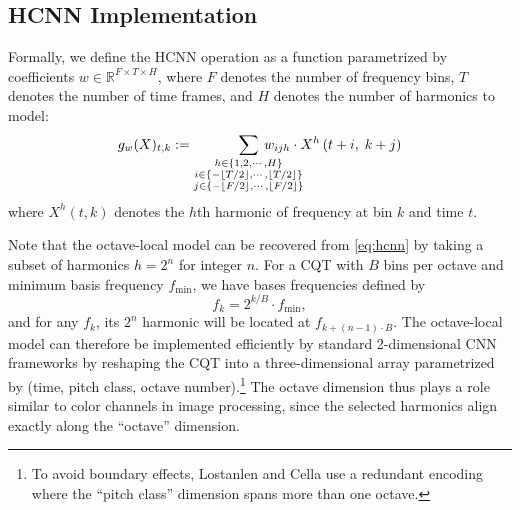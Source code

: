 \documentclass{article}
\begin{document}
\subsection{HCNN Implementation}

Formally, we define the HCNN operation as a function parametrized by coefficients $w \in \mathbb{R}^{F \times T \times H}$, where $F$ denotes the number of frequency bins, $T$ denotes the number of time frames, and $H$ denotes the number of harmonics to model:
\begin{equation}
    g_w(X)_{t, k} := 
    \sum_{\substack{
        h \in \{1, 2, \cdots, H\}\\
        i \in \{-\lfloor T/2\rfloor, \cdots, \lfloor T/2 \rfloor\}\\
        j \in \{-\lfloor F/2\rfloor, \cdots, \lfloor F/2 \rfloor\}}
    }
    \hspace{-3em}%
    w_{ijh} \cdot X^h\left(t + i,\; k + j\right)\label{eq:hcnn}
\end{equation}
where $X^h(t, k)$ denotes the $h$th harmonic of frequency at bin $k$ and time $t$.

Note that the octave-local model can be recovered from \cref{eq:hcnn} by taking a subset of harmonics $h=2^n$ for integer $n$.
For a CQT with $B$ bins per octave and minimum basis frequency $f_{\min}$, we have bases frequencies defined by
\begin{equation}
    f_k = 2^{k/B} \cdot f_{\min}, \label{eq:cqtfreqs}
\end{equation}
and for any $f_k$, its $2^n$ harmonic will be located at $f_{k + (n-1)\cdot B}$.
The octave-local model can therefore be implemented efficiently by standard 2-dimensional CNN frameworks by reshaping the CQT into a three-dimensional array parametrized by (time, pitch class, octave number).\footnote{To avoid boundary effects, Lostanlen and Cella use a redundant encoding where the ``pitch class'' dimension spans more than one octave.}
The octave dimension thus plays a role similar to color channels in image processing, since the selected harmonics align exactly along the ``octave'' dimension.
\end{document}
